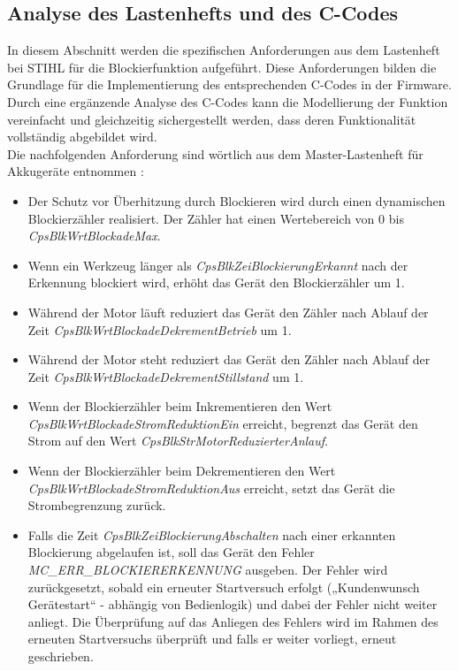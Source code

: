 \subsection{Analyse des Lastenhefts und des C-Codes}
\label{subsec_blk_analyse}
In diesem Abschnitt werden die spezifischen Anforderungen aus dem Lastenheft bei STIHL für die Blockierfunktion aufgeführt. Diese Anforderungen bilden die Grundlage für die Implementierung des entsprechenden C-Codes in der Firmware. Durch eine ergänzende Analyse des C-Codes kann die Modellierung der Funktion vereinfacht und gleichzeitig sichergestellt werden, dass deren Funktionalität vollständig abgebildet wird. \\
Die nachfolgenden Anforderung sind wörtlich aus dem Master-Lastenheft für Akkugeräte entnommen \cite{Lastenheft}:
\begin{itemize}
\item Der Schutz vor Überhitzung durch Blockieren wird durch einen dynamischen Blockierzähler realisiert. Der Zähler hat einen Wertebereich von 0 bis \textit{CpsBlkWrtBlockadeMax}.
\item Wenn ein Werkzeug länger als \textit{CpsBlkZeiBlockierungErkannt} nach der Erkennung blockiert wird, erhöht das Gerät den Blockierzähler um 1.
\item Während der Motor läuft reduziert das Gerät den Zähler nach Ablauf der Zeit \textit{CpsBlkWrtBlockadeDekrementBetrieb} um 1. 
\item Während der Motor steht reduziert das Gerät den Zähler nach Ablauf der Zeit \textit{CpsBlkWrtBlockadeDekrementStillstand} um 1.
\item Wenn der Blockierzähler beim Inkrementieren den Wert \textit{CpsBlkWrtBlockadeStromReduktionEin} erreicht, begrenzt das Gerät den Strom auf den Wert \textit{CpsBlkStrMotorReduzierterAnlauf}.
\item Wenn der Blockierzähler beim Dekrementieren den Wert \textit{CpsBlkWrtBlockadeStromReduktionAus} erreicht, setzt das Gerät die Strombegrenzung zurück.
\item Falls die Zeit \textit{CpsBlkZeiBlockierungAbschalten} nach einer erkannten Blockierung abgelaufen ist, soll das Gerät den Fehler \textit{MC\_ERR\_BLOCKIERERKENNUNG} ausgeben. Der Fehler wird zurückgesetzt, sobald ein erneuter Startversuch erfolgt („Kundenwunsch Gerätestart“ - abhängig von Bedienlogik) und dabei der Fehler nicht weiter anliegt. Die Überprüfung auf das Anliegen des Fehlers wird im Rahmen des erneuten Startversuchs überprüft und falls er weiter vorliegt, erneut geschrieben.
\end{itemize}
